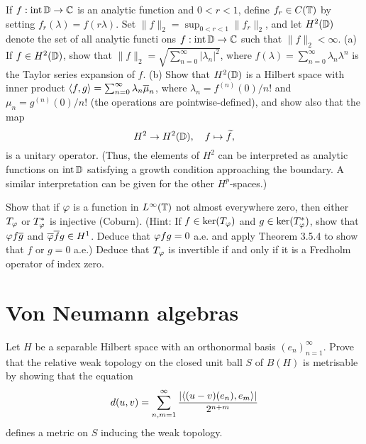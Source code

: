 \documentclass{article}
\begin{document}
\begin{prb}
If $f:\operatorname{int}\mathbb{D}\to\mathbb{C}$ is an analytic function and $0<r<1$, define $f_r\in C(\mathbb{T})$ by setting $f_r(\lambda)=f(r\lambda)$.
Set $\|f\|_2=\sup_{0<r<1}\|f_r\|_2$, and let $H^2(\mathbb{D})$ denote the set of all analytic functi ons $f:\operatorname{int}\mathbb{D}\to\mathbb{C}$ such that $\|f\|_2<\infty$.
(a) If $f\in H^2(\mathbb{D})$, show that $\|f\|_2=\sqrt{\sum_{n=0}^\infty|\lambda_n|^2}$, where $f(\lambda)=\sum_{n=0}^\infty\lambda_n\lambda^n$ is the Taylor series expansion of $f$.
(b) Show that $H^2(\mathbb{D})$ is a Hilbert space with inner product $\langle f,g\rangle=\sum_{n=0}^\infty\lambda_n\overline\mu_n$, where $\lambda_n=f^{(n)}(0)/n!$ and $\mu_n=g^{(n)}(0)/n!$ (the operations are pointwise-defined), and show also that the map 
\[H^2\to H^2(\mathbb{D}),\quad f\mapsto\widetilde f,\]
is a unitary operator.
(Thus, the elements of $H^2$ can be interpreted as analytic functions on $\operatorname{int}\mathbb{D}$ satisfying a growth condition approaching the boundary.
A similar interpretation can be given for the other $H^p$-spaces.)
\end{prb}
\begin{sol}
\end{sol}


\begin{prb}
Show that if $\varphi$ is a function in $L^\infty(\mathbb{T})$ not almost everywhere zero, then either $T_\varphi$ or $T_\varphi^*$ is injective (Coburn).
(Hint: If $f\in\ker(T_\varphi)$ and $g\in\ker(T_\varphi^*)$, show that $\varphi f\overline g$ and $\overline{\varphi}\overline fg\in H^1$.
Deduce that $\varphi fg=0$ a.e. and apply Theorem 3.5.4 to show that $f$ or $g=0$ a.e.)
Deduce that $T_\varphi$ is invertible if and only if it is a Fredholm operator of index zero.
\end{prb}
\begin{sol}
\end{sol}


\section{Von Neumann algebras}

\begin{prb}
Let $H$ be a separable Hilbert space with an orthonormal basis $(e_n)_{n=1}^\infty$.
Prove that the relative weak topology on the closed unit ball $S$ of $B(H)$ is metrisable by showing that the equation
\[d(u,v)=\sum_{n,m=1}^\infty\frac{|\langle(u-v)(e_n), e_m\rangle|}{2^{n+m}}\]
defines a metric on $S$ inducing the weak topology.
\end{prb}
\begin{sol}
\end{sol}
\end{document}
